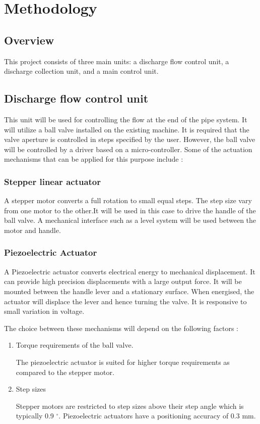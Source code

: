 \section{Methodology}
\subsection{Overview}
This project consists of three main units: a discharge flow control unit, a discharge collection  unit, and a main control unit. 
\subsection{Discharge flow control unit}
This unit will be used for controlling the flow at the end of the pipe system. It will utilize a ball valve installed on the existing machine. It is required that the valve aperture is controlled in steps specified by the user. However, the ball valve will be controlled by a driver based on a micro-controller. Some of the actuation mechanisms that can be applied for this purpose include :

\subsubsection{Stepper linear actuator}

A stepper motor converts a full rotation to small equal steps. The step size vary from one motor to the other.It will be used in this case to drive the handle of the ball valve. A mechanical interface such as a level system will be used between the motor and handle.

\subsubsection{Piezoelectric Actuator}

A Piezoelectric actuator converts electrical energy to mechanical displacement. It can provide high precision displacements with a large output force. It will be mounted between the handle lever and a stationary surface. When energised, the actuator will displace the lever and hence turning the valve. It is responsive to small variation in voltage.

\par

The choice between these mechanisms will depend on the following factors :
\begin{enumerate}
    \item Torque requirements  of the ball valve. 
    \par The piezoelectric actuator is suited for higher torque requirements as compared to the stepper motor. 
    \item Step sizes
    \par Stepper motors are restricted to step sizes above their step angle which is typically 0.9 $^{\circ}$. Piezoelectric actuators have a positioning accuracy of 0.3 mm.
\end{enumerate}

